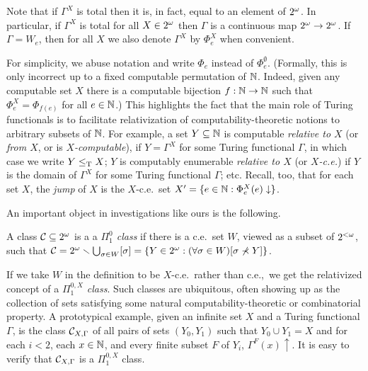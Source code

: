 \noindent Note that if $\Gamma^X$ is total then it is, in fact, equal to an element of ${2^{\omega}}$. In particular, if $\Gamma^X$ is total for all $X \in {2^{\omega}}$ then $\Gamma$ is a continuous map ${2^{\omega}} \to {2^{\omega}}$. If $\Gamma = W_e$, then for all $X$ we also denote $\Gamma^X$ by $\Phi^X_e$ when convenient.

For simplicity, we abuse notation and write $\Phi_e$ instead of $\Phi_e^{\emptyset}$. (Formally, this is only incorrect up to a fixed computable permutation of $\mathbb{N}$. Indeed, given any computable set $X$ there is a computable bijection $f: \mathbb{N} \to \mathbb{N}$ such that $\Phi^X_e = \Phi_{f(e)}$ for all $e \in \mathbb{N}$.) This highlights the fact that the main role of Turing functionals is to facilitate relativization of computability-theoretic notions to arbitrary subsets of $\mathbb{N}$. For example, a set $Y \subseteq \mathbb{N}$ is computable \emph{relative to $X$} (or \emph{from $X$}, or is \emph{$X$-computable}), if $Y = \Gamma^X$ for some Turing functional $\Gamma$, in which case we write $Y \leq_{\text{\upshape T}} X$; $Y$ is computably enumerable \emph{relative to $X$} (or \emph{$X$-c.e.}) if $Y$ is the domain of $\Gamma^X$ for some Turing functional $\Gamma$; etc. Recall, too, that for each set $X$, the \emph{jump} of $X$ is the $X$-c.e.\ set $X' = \{e \in \mathbb{N}: \Phi_e^X(e) \downarrow \}$.

An important object in investigations like ours is the following.

\begin{definition}
	A class $\mathcal{C} \subseteq {2^{\omega}}$ is a a \emph{$\Pi^0_1$ class} if there is a c.e.\ set $W$, viewed as a subset of ${2^{<\omega}}$, such that $\mathcal{C} = {2^{\omega}} \smallsetminus \bigcup_{\sigma \in W} [\sigma] = \{Y \in {2^{\omega}}: (\forall \sigma \in W)[\sigma \nprec Y]\}$.
\end{definition}

\noindent If we take $W$ in the definition to be $X$-c.e.\ rather than c.e.,\ we get the relativized concept of a \emph{$\Pi^{0,X}_1$ class}. Such classes are ubiquitous, often showing up as the collection of sets satisfying some natural computability-theoretic or combinatorial property. A prototypical example, given an infinite set $X$ and a Turing functional $\Gamma$, is the class $\mathcal{C}_{X,\Gamma}$ of all pairs of sets $(Y_0,Y_1)$ such that $Y_0 \cup Y_1 = X$ and for each $i < 2$, each $x \in \mathbb{N}$, and every finite subset $F$ of $Y_i$, $\Gamma^F(x) \uparrow$. It is easy to verify that $\mathcal{C}_{X,\Gamma}$ is a $\Pi^{0,X}_1$ class.

